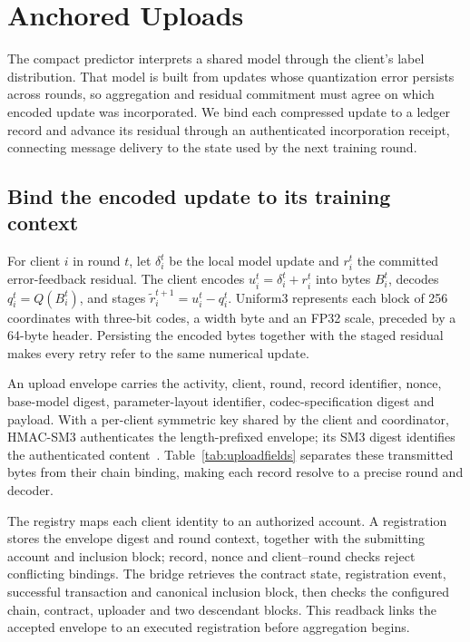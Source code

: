 \section{Anchored Uploads}\label{sec:anchored}
The compact predictor interprets a shared model through the client's label distribution. That model is built from updates whose quantization error persists across rounds, so aggregation and residual commitment must agree on which encoded update was incorporated. We bind each compressed update to a ledger record and advance its residual through an authenticated incorporation receipt, connecting message delivery to the state used by the next training round.

\subsection{Bind the encoded update to its training context}
For client $i$ in round $t$, let $\delta_i^t$ be the local model update and $r_i^t$ the committed error-feedback residual. The client encodes $u_i^t=\delta_i^t+r_i^t$ into bytes $B_i^t$, decodes $q_i^t=Q(B_i^t)$, and stages $\widetilde r_i^{t+1}=u_i^t-q_i^t$. Uniform3 represents each block of 256 coordinates with three-bit codes, a width byte and an FP32 scale, preceded by a 64-byte header. Persisting the encoded bytes together with the staged residual makes every retry refer to the same numerical update.

An upload envelope carries the activity, client, round, record identifier, nonce, base-model digest, parameter-layout identifier, codec-specification digest and payload. With a per-client symmetric key shared by the client and coordinator, HMAC-SM3 authenticates the length-prefixed envelope; its SM3 digest identifies the authenticated content~\cite{rfc2104,shen2018sm3}. Table~\ref{tab:uploadfields} separates these transmitted bytes from their chain binding, making each record resolve to a precise round and decoder.


The registry maps each client identity to an authorized account. A registration stores the envelope digest and round context, together with the submitting account and inclusion block; record, nonce and client--round checks reject conflicting bindings. The bridge retrieves the contract state, registration event, successful transaction and canonical inclusion block, then checks the configured chain, contract, uploader and two descendant blocks. This readback links the accepted envelope to an executed registration before aggregation begins.

